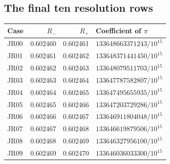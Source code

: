 \documentclass[11pt]{article}
\theoremstyle{remark}\newtheorem{remark}[theorem]{Remark}
\begin{document}
\subsection{The final ten resolution rows}
\begin{longtable}{@{}lrrl@{}}\toprule
Case & $R_-$ & $R_+$ & Coefficient of $\pi$\\\midrule\endhead
JR00 & 0.602460 & 0.602461 & $133648663371243/10^{15}$\\
JR01 & 0.602461 & 0.602462 & $133648371441450/10^{15}$\\
JR02 & 0.602462 & 0.602463 & $133648079511703/10^{15}$\\
JR03 & 0.602463 & 0.602464 & $133647787582807/10^{15}$\\
JR04 & 0.602464 & 0.602465 & $133647495655935/10^{15}$\\
JR05 & 0.602465 & 0.602466 & $133647203729286/10^{15}$\\
JR06 & 0.602466 & 0.602467 & $133646911804048/10^{15}$\\
JR07 & 0.602467 & 0.602468 & $133646619879506/10^{15}$\\
JR08 & 0.602468 & 0.602469 & $133646327956100/10^{15}$\\
JR09 & 0.602469 & 0.602470 & $133646036033300/10^{15}$\\
\bottomrule\end{longtable}
\end{document}
